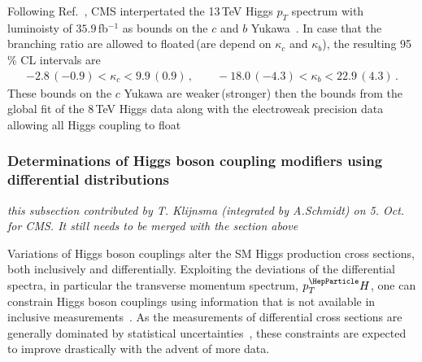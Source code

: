 \documentclass[../report.tex]{subfiles}
\newcommand{\pt}{\ensuremath{p_T}\xspace}
\newcommand{\hboson}{\ensuremath{\PH}\xspace}
\newcommand{\pth}{\ensuremath{\pt^\hboson}\xspace}
\begin{document}
Following Ref.~\cite{Bishara:2016jga}, CMS interpertated the 13\,TeV Higgs $p_T$ spectrum with luminoisty of $35.9\,$fb$^{-1}$ as bounds on the $c$ and $b$ Yukawa~\cite{CMS:2018hhg}. In case that the branching ratio are allowed to floated\,(are depend on $\kappa_c$ and $\kappa_b$), the resulting 95\,\% CL intervals are
%
\begin{align}
    -2.8\,(-0.9) < \kappa_c < 9.9\,(0.9) \, , \qquad
    -18.0\,(-4.3) < \kappa_b < 22.9\,(4.3) \, .
\end{align}
%
These bounds on the $c$ Yukawa are weaker\,(stronger) then the bounds from the global fit of the 8\,TeV Higgs data along with the electroweak precision data allowing all Higgs coupling to float~\cite{Perez:2015aoa}  

\subsubsection{Determinations of Higgs boson coupling modifiers using differential distributions}

{\it this subsection contributed by T. Klijnsma (integrated by A.Schmidt) on 5. Oct. for CMS. It still needs to be merged with the section above}


Variations of Higgs boson couplings alter the SM Higgs production cross sections, both inclusively and differentially.
% 
Exploiting the deviations of the differential spectra, in particular the transverse momentum spectrum, $\pth$, one can constrain Higgs boson couplings using information that is not available in inclusive measurements~\cite{%
Khachatryan:2016vau,%
Aad:2015zhl,%
CMS:2018lkl%
}.
% 
As the measurements of differential cross sections are generally dominated by statistical uncertainties~\cite{CMS-PAS-HIG-17-028}, these constraints are expected to improve drastically with the advent of more data.
\end{document}
